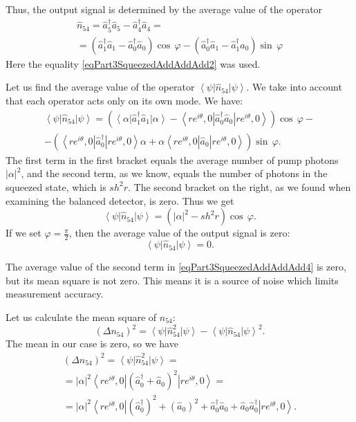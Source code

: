 Thus, the output signal is determined by the average value of the operator
\begin{eqnarray}
\hat{n}_{54} = \hat{a}_5^{\dag}\hat{a}_5 - 
\hat{a}_4^{\dag}\hat{a}_4 = 
\nonumber \\
=
\left(
\hat{a}_1^{\dag}\hat{a}_1 - 
\hat{a}_0^{\dag}\hat{a}_0
\right) \cos\,\varphi
- 
\left(
\hat{a}_0^{\dag}\hat{a}_1 - 
\hat{a}_1^{\dag}\hat{a}_0
\right) \sin\,\varphi
\end{eqnarray}
Here the equality \eqref{eqPart3SqueezedAddAddAdd2} was used.

Let us find the average value of the operator
$\left<\psi\right|\hat{n}_{54}\left|\psi\right>$. We take into account that
each operator acts only on its own mode. We have:
\begin{eqnarray}
\left<\psi\right|\hat{n}_{54}\left|\psi\right> = 
\left(
\left<\alpha\right|\hat{a}_1^{\dag}\hat{a}_1\left|\alpha\right>
- 
\left<r e^{i\theta}, 0\right|\hat{a}_0^{\dag}\hat{a}_0\left|r
e^{i\theta}, 0\right> 
\right) \cos\,\varphi -
\nonumber \\
-
\left(
\left<r e^{i\theta}, 0\right|\hat{a}_0^{\dag}\left|r
e^{i\theta}, 0\right>\alpha +
\alpha 
\left<r e^{i\theta}, 0\right|\hat{a}_0\left|r
e^{i\theta}, 0\right>
\right) \sin\,\varphi.
\label{eqPart3SqueezedAddAddAdd4}
\end{eqnarray}
The first term in the first bracket equals the average number of pump photons
$\left|\alpha\right|^2$, and the second term, as we know, equals the number of
photons in the squeezed state, which is $sh^2 r$. The second bracket on the right, as
we found when examining the balanced detector, is zero. Thus we get
\begin{equation}
\left<\psi\right|\hat{n}_{54}\left|\psi\right> = 
\left(
\left|\alpha\right|^2 - sh^2 r
\right)
\cos\,\varphi.
\nonumber
\end{equation}
If we set $\varphi=\frac{\pi}{2}$, then the average value of the output
signal is zero:
\[
\left<\psi\right|\hat{n}_{54}\left|\psi\right> = 0.
\]

The average value of the second term in \eqref{eqPart3SqueezedAddAddAdd4}
is zero, but its mean square is not zero. This means it is a source of noise
which limits measurement accuracy.

Let us calculate the mean square of $\hat{n}_{54}$:
\begin{equation}
\left(\Delta n_{54}\right)^2 = 
\left<\psi\right|\hat{n}_{54}^2\left|\psi\right> -
\left<\psi\right|\hat{n}_{54}\left|\psi\right>^2.
\nonumber
\end{equation}
The mean in our case is zero, so we have
\begin{eqnarray}
\left(\Delta n_{54}\right)^2 = 
\left<\psi\right|\hat{n}_{54}^2\left|\psi\right> =
\nonumber \\
=
\left|\alpha\right|^2
\left<r e^{i\theta}, 0\right|
\left(\hat{a}_0^{\dag} + \hat{a}_0\right)^2
\left|r e^{i\theta}, 0\right> =
\nonumber \\
=
\left|\alpha\right|^2
\left<r e^{i\theta}, 0\right|
\left(\hat{a}_0^{\dag}\right)^2 + 
\left(\hat{a}_0\right)^2 + 
\hat{a}_0^{\dag}\hat{a}_0 +
\hat{a}_0\hat{a}_0^{\dag}
\left|r e^{i\theta}, 0\right>.
\nonumber
\end{eqnarray}


